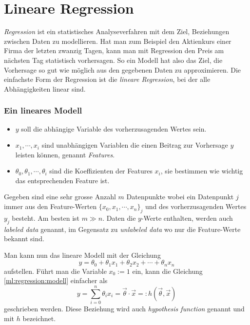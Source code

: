 %
%
%
%

\section{Lineare Regression\label{ml:regression}}

\emph{Regression} ist ein statistisches Analyseverfahren mit dem Ziel, Beziehungen zwischen
%
Daten zu modellieren. Hat man zum Beispiel den Aktienkurs einer Firma der letzten zwanzig
Tagen, kann man mit Regression den Preis am nächsten Tag statistisch vorhersagen.
So ein Modell hat also das Ziel, die Vorhersage so gut wie möglich aus den gegebenen Daten zu approximieren.
Die einfachste Form der Regression ist die \emph{lineare Regression}, bei der alle Abhängigkeiten linear
sind.
%

\subsubsection{Ein lineares Modell}
\begin{itemize}
    \item $y$ soll die abhängige Variable des vorherzusagenden Wertes sein.
    \item $x_1, \cdots, x_i$ sind unabhängigen Variablen die einen Beitrag zur Vorhersage
    $y$ leisten können, genannt \emph{Features}.
    \item $\theta_0, \theta_1, \cdots, \theta_i$ sind die Koeffizienten der Features $x_i$,
    sie bestimmen wie wichtig das entsprechenden Feature ist.
\end{itemize}

Gegeben sind eine sehr grosse Anzahl $m$ Datenpunkte wobei ein Datenpunkt $j$ immer aus
den Feature-Werten $\{ x_0, x_1, \cdots, x_n \}_j$ und des vorherzusagenden Wertes $y_j$ besteht.
Am besten ist $m \gg n$. Daten die $y$-Werte enthalten, werden auch \emph{labeled data} genannt,
%
im Gegensatz zu \emph{unlabeled data} wo nur die Feature-Werte bekannt sind.
%

Man kann nun das lineare Modell mit der Gleichung
\begin{equation}
y = \theta_0 + \theta_1 x_1 + \theta_2 x_2 + \cdots + \theta_n x_n
\label{ml:regression:modell}
\end{equation}
aufstellen. Führt man die Variable $x_0 := 1$ ein, kann die Gleichung
\ref{ml:regression:modell} einfacher als
\begin{equation}
y = \sum_{i = 0}^{n} \theta_i x_i = \vec \theta \cdot \vec x =: h(\vec\theta, \vec x)
\label{ml:regression:hypothesis}
\end{equation}
geschrieben werden. Diese Beziehung wird auch \emph{hypothesis function} genannt und mit
%
$h$ bezeichnet.

